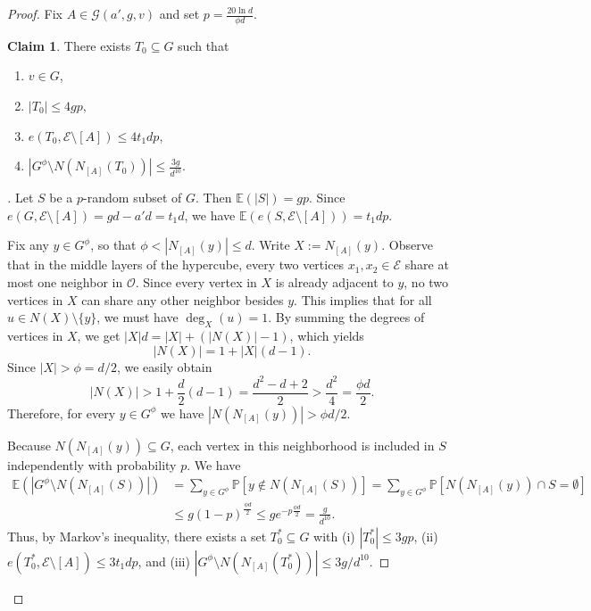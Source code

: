 \documentclass{amsart}
\newenvironment{subproof}[1][\proofname]{
  \renewcommand{\qedsymbol}{$\blacksquare$}
  \begin{proof}[#1]
}{
  \end{proof}
}
\theoremstyle{definition}
\newtheorem{claim}[thm]{Claim}
\newcommand{\PP}{\mathbb{P}}
\newcommand{\EE}{\mathbb{E}}
\newcommand{\cO}{\mathcal{O} }
\newcommand{\cE}{\mathcal{E} }
\newcommand{\cG}{\mathcal{G} }
\newcommand{\0}[0]{\emptyset}
\begin{document}
\begin{proof}
    Fix $A\in\cG(a',g,v)$ and set $p=\frac{20 \ln d}{\phi d}$.

\begin{claim}\label{claim:t0}
    There exists $T_0\subseteq G$ such that
    \begin{enumerate}
        \item $v\in G$,
        \item $|T_0|\leq 4gp$,
        \item $e(T_0,\cE\setminus[A])\leq 4t_1dp$,
        \item $|G^\phi\setminus N(N_{[A]}(T_0))|\leq \frac{3g}{d^{10}}$.
    \end{enumerate}
\end{claim}
\begin{subproof}
    Let $S$ be a $p$-random subset of $G$. Then $\EE(|S|)=gp$. Since $e(G,\cE\setminus[A])=gd-a'd=t_1d$, we have $\EE (e(S,\cE\setminus[A]))=t_1dp$. 

    Fix any $y\in G^\phi$, so that $\phi<|N_{[A]}(y)|\leq d$. Write $X:=N_{[A]}(y)$.
    Observe that in the middle layers of the hypercube, every two vertices $x_1, x_2\in \cE$ share at most one neighbor in $\cO$. 
    Since every vertex in $X$ is already adjacent to $y$, no two vertices in $X$ can share any other neighbor besides $y$. 
    This implies that for all $u \in N(X) \setminus \{y\}$, we must have $\deg_X(u) = 1$. 
    By summing the degrees of vertices in $X$, we get $|X|d = |X| + (|N(X)| - 1)$, which yields
    \[
        |N(X)| = 1 + |X|(d-1).
    \]
    Since $|X| > \phi = d/2$, we easily obtain
    \[
        |N(X)| > 1 + \frac{d}{2}(d-1) = \frac{d^2 - d + 2}{2} > \frac{d^2}{4} = \frac{\phi d}{2}.
    \]
    Therefore, for every $y\in G^\phi$ we have $|N(N_{[A]}(y))| > \phi d/2$.

    Because $N(N_{[A]}(y)) \subseteq G$, each vertex in this neighborhood is included in $S$ independently with probability $p$. We have
    \begin{align*}
        \EE(|G^\phi\setminus N(N_{[A]}(S))|)&=\sum_{y\in G^\phi}\PP[y\notin N(N_{[A]}(S))]
        =\sum_{y\in G^\phi}\PP[N(N_{[A]}(y))\cap S=\emptyset]\\
        &\leq g(1-p)^{\frac{\phi d}{2 }}\leq ge^{-p \frac{\phi d}{2}} = \frac{g}{d^{10}}.
    \end{align*}
    Thus, by Markov's inequality, there exists a set $T_0^*\subseteq G$ with (i) $|T_0^*|\leq 3gp$, (ii) $e(T_0^*,\cE\setminus[A])\leq 3t_1dp$, and (iii) $|G^\phi\setminus N(N_{[A]}(T_0^*))|\leq 3g/d^{10}$. 
    

\end{subproof}
\end{proof}
\end{document}
